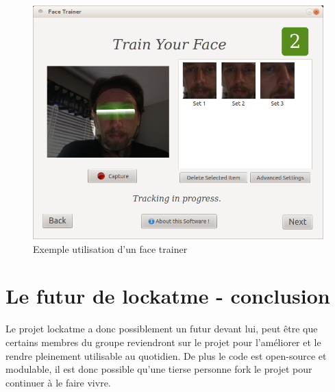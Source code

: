 \documentclass[french]{report}
\begin{document}
\begin{figure}[h]\label{fig:facetrain}
  \includegraphics[width=\linewidth]{facetrain}
  \caption{Exemple utilisation d'un face trainer}
  \label{fig:facetrain}
\end{figure}

\newpage

\section{Le futur de lockatme - conclusion}
Le projet lockatme a donc possiblement un futur devant lui, peut être que certains
membres du groupe reviendront sur le projet pour l'améliorer et le rendre pleinement
utilisable au quotidien. De plus le code est open-source et modulable, il est
donc possible qu'une tierse personne fork le projet pour continuer à le faire vivre.\\
\end{document}
